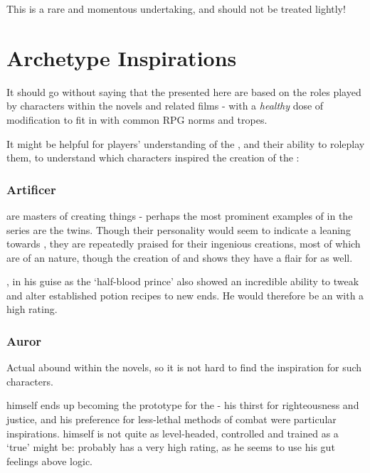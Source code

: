This is a rare and momentous undertaking, and should not be treated lightly!

\section{Archetype Inspirations}

It should go without saying that the  presented here are based on the roles played by characters within the  novels and related films - with a {\it healthy} dose of modification to fit in with common RPG norms and tropes. 

It might be helpful for players' understanding of the , and their ability to roleplay them,  to understand which characters inspired the creation of the :

\subsubsection{Artificer}

 are masters of creating things - perhaps the most prominent examples of  in the series are the  twins. Though their personality would seem to indicate a leaning towards , they are repeatedly praised for their ingenious creations, most of which are of an  nature, though the creation of  and  shows they have a flair for  as well. 

, in his guise as the `half-blood prince' also showed an incredible ability to tweak and alter established potion recipes to new ends. He would therefore be an  with a high  rating.

\subsubsection{Auror}

Actual  abound within the  novels, so it is not hard to find the inspiration for such characters. 

 himself ends up becoming the prototype for the  - his thirst for righteousness and justice, and his preference for less-lethal methods of combat were particular inspirations.  himself is not quite as level-headed, controlled and trained as a `true'  might be:  probably has a very high  rating, as he seems to use his gut feelings above logic.


